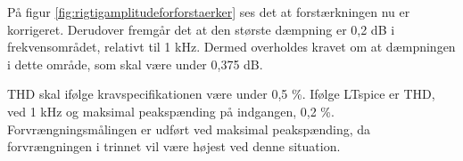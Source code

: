 På figur \ref{fig:rigtigamplitudeforforstaerker} ses det at forstærkningen nu er korrigeret. Derudover fremgår det at den største dæmpning er 0,2 dB i frekvensområdet, relativt til 1 kHz. Dermed overholdes kravet om at dæmpningen i dette område, som skal være under 0,375 dB. 

THD skal ifølge kravspecifikationen være under 0,5 \%. Ifølge LTspice er THD, ved 1 kHz og maksimal peakspænding på indgangen, 0,2 \%. Forvrængningsmålingen er udført ved maksimal peakspænding, da forvrængningen i trinnet vil være højest ved denne situation. 